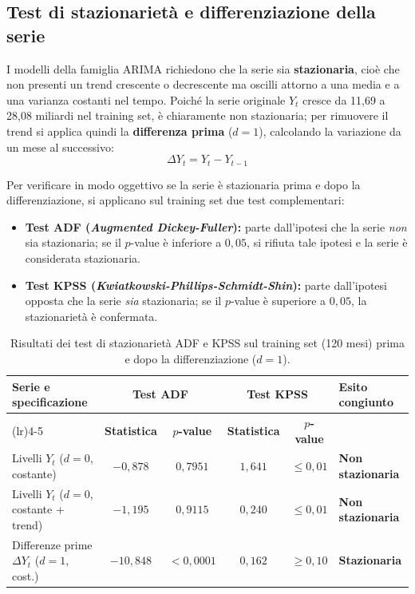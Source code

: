 \subsection{Test di stazionarietà e differenziazione della serie}

I modelli della famiglia ARIMA richiedono che la serie sia \textbf{stazionaria}, cioè che non presenti un trend crescente o decrescente ma oscilli attorno a una media e a una varianza costanti nel tempo. Poiché la serie originale $Y_t$ cresce da 11,69 a 28,08 miliardi nel training set, è chiaramente non stazionaria; per rimuovere il trend si applica quindi la \textbf{differenza prima} ($d = 1$), calcolando la variazione da un mese al successivo:
\begin{equation}
    \Delta Y_t = Y_t - Y_{t-1}
    \label{eq:differenziazione_prima}
\end{equation}

Per verificare in modo oggettivo se la serie è stazionaria prima e dopo la differenziazione, si applicano sul training set due test complementari:
\begin{itemize}
    \item \textbf{Test ADF (\textit{Augmented Dickey-Fuller}):} parte dall'ipotesi che la serie \textit{non} sia stazionaria; se il $p$-value è inferiore a $0,05$, si rifiuta tale ipotesi e la serie è considerata stazionaria.
    \item \textbf{Test KPSS (\textit{Kwiatkowski-Phillips-Schmidt-Shin}):} parte dall'ipotesi opposta che la serie \textit{sia} stazionaria; se il $p$-value è superiore a $0,05$, la stazionarietà è confermata.
\end{itemize}

\begin{table}[!htbp]
\centering
\small
\setlength{\tabcolsep}{4.5pt}
\caption{Risultati dei test di stazionarietà ADF e KPSS sul training set (120 mesi) prima e dopo la differenziazione ($d = 1$).}
\label{tab:test_stazionarieta}
\vspace{0.2cm}
\begin{tabularx}{\textwidth}{>{\raggedright\arraybackslash}p{5.5cm} cccc >{\centering\arraybackslash}X}
\toprule
\textbf{Serie e specificazione} & \multicolumn{2}{c}{\textbf{Test ADF}} & \multicolumn{2}{c}{\textbf{Test KPSS}} & \textbf{Esito congiunto} \\
\cmidrule(lr){2-3} \cmidrule(lr){4-5}
& \textbf{Statistica} & \textbf{$p$-value} & \textbf{Statistica} & \textbf{$p$-value} & \\
\midrule
Livelli $Y_t$ ($d=0$, costante) & $-0,878$ & $0,7951$ & $1,641$ & $\le 0,01$ & \textbf{Non stazionaria} \\
Livelli $Y_t$ ($d=0$, costante + trend) & $-1,195$ & $0,9115$ & $0,240$ & $\le 0,01$ & \textbf{Non stazionaria} \\
Differenze prime $\Delta Y_t$ ($d=1$, cost.) & $-10,848$ & $< 0,0001$ & $0,162$ & $\ge 0,10$ & \textbf{Stazionaria} \\
\bottomrule
\end{tabularx}
\end{table}

